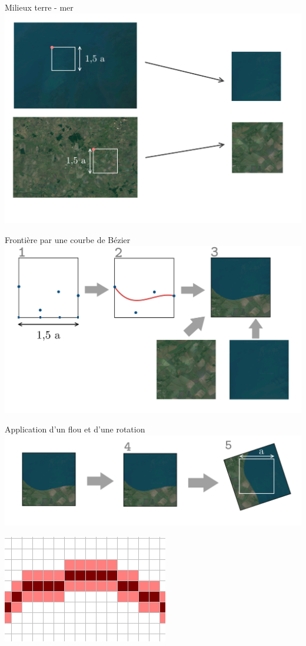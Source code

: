 \documentclass[ignorenonframetext,]{beamer}
\begin{document}
\begin{frame}{Milieux terre - mer}
	\includegraphics{fabricationImage.png}
\end{frame}

\begin{frame}{Frontière par une courbe de Bézier}
	\includegraphics{procede1.png}
\end{frame}

\begin{frame}{Application d'un flou et d'une rotation}
	\includegraphics{procede2.png}
	\begin{center}
		\includegraphics[width=.3\linewidth]{flou.png}
	\end{center}
\end{frame}
\end{document}
